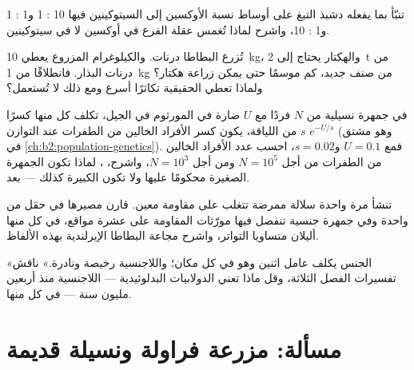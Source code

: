 \begin{exercise}[$\star\star$]\label{exo:b2:asexual-reproduction:8}
تنبّأ بما يفعله دشبذ التبغ على أوساط نسبة الأوكسين إلى السيتوكينين
فيها 10 : 1 و1 : 1 و1 : 10، واشرح لماذا تُغمس عقلة الفرع في
أوكسين لا في سيتوكينين.
\end{exercise}

\begin{exercise}[$\star\star$]\label{exo:b2:asexual-reproduction:9}
تُزرع البطاطا درنات. والكيلوغرام المزروع يعطي
\qty{10}{kg}، والهكتار يحتاج إلى \qty{2}{t} من درنات البذار.
فانطلاقًا من \qty{1}{kg} من صنف جديد، كم موسمًا حتى يمكن زراعة
هكتار؟ ولماذا تعطي  الحقيقية تكاثرًا أسرع ومع ذلك لا تُستعمل؟
\end{exercise}

\begin{exercise}[$\star\star\star$]\label{exo:b2:asexual-reproduction:10}
في جمهرة نسيلية من $N$ فردًا مع $U$  ضارة
في المورثوم في الجيل، تكلف كل منها كسرًا $s$ من اللياقة،
يكون كسر الأفراد الخالين من الطفرات عند التوازن
$e^{-U/s}$ (وهو مشتق في \cref{ch:b2:population-genetics}). فمع $U =
0.1$ و$s = 0.02$، احسب عدد الأفراد الخالين من الطفرات
من أجل $N = 10^{5}$ ومن أجل $N = 10^{3}$، واشرح، ، لماذا تكون الجمهرة الصغيرة محكومًا عليها ولا تكون الكبيرة
كذلك --- بعد.
\end{exercise}

\begin{exercise}[$\star\star\star$]\label{exo:b2:asexual-reproduction:11}
تنشأ مرة واحدة سلالة ممرضة تتغلب على مقاومة  معين.
قارن مصيرها في حقل من  واحدة وفي جمهرة جنسية تنفصل فيها
مورّثات المقاومة على عشرة مواقع، في كل منها أليلان متساويا
التواتر، واشرح مجاعة البطاطا الإيرلندية بهذه الألفاظ.
\end{exercise}

\begin{exercise}[$\star\star\star$]\label{exo:b2:asexual-reproduction:12}
«الجنس يكلف عامل اثنين وهو في كل مكان؛ واللاجنسية رخيصة
ونادرة.» ناقش تفسيرات الفصل الثلاثة، وقل ماذا تعني الدولابيات
البدلوئيدية --- اللاجنسية منذ أربعين مليون سنة --- في كل منها.
\end{exercise}

\section{مسألة: مزرعة فراولة ونسيلة قديمة}

